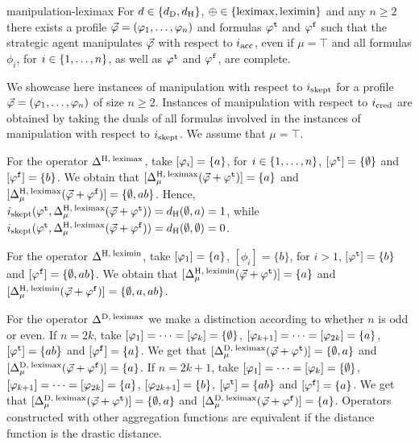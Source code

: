 \begin{thm}{}{manipulation-leximax}
	For $d\in\set{\dd_\drastic,\dd_\hamming}$, $\agg\in\set{\leximax,\leximin}$
	and any $n\geq 2$ there exists a profile $\P=(\phi_1,\dots,\phi_n)$ and formulas
	$\truth{\phi}$ and $\manip{\phi}$ such that the strategic agent 
	manipulates $\P$ with respect to $i_\acc$,
	even if $\mu=\top$ and all formulas $\phi_i$, 
	for $i\in\set{1,\dots,n}$, as well as $\truth{\phi}$ and $\manip{\phi}$, are complete.
\end{thm}
\begin{prf*}{}{}%
	We showcase here instances of manipulation with respect 
	to $i_\skept$ for a profile $\P=(\phi_1,\dots,\phi_n)$ 
	of size $n\geq 2$. Instances of manipulation with respect to 
	$i_\cred$ are obtained by taking the duals of 
	all formulas involved in the instances of manipulation with respect to $i_\skept$.
	We assume that $\mu=\top$.
	
	For the operator $\me^{\hamming,\:\leximax}$,
	take $\mods{\phi_i}=\set{a}$, 
	for $i\in\set{1,\dots,n}$, 
	$\mods{\truth{\phi}}=\set{\emptyset}$ 
	and $\mods{\manip{\phi}}=\set{b}$.
	We obtain that 
	$\mods{\me^{\hamming,\:\leximax}_{\mu}(\P+\truth{\phi})}=\set{a}$ and 
	$\mods{\me^{\hamming,\:\leximax}_{\mu}(\P+\manip{\phi})}=\set{\emptyset,ab}$.
	Hence, $\iskept(\truth{\phi}, \me^{\hamming,\:\leximax}_{\mu}(\P+\truth{\phi})) = \dd_{\hamming}(\emptyset,a)=1$,
	while $\iskept(\truth{\phi}, \me^{\hamming,\:\leximax}_{\mu}(\P+\manip{\phi})) = \dd_{\hamming}(\emptyset,\emptyset)=0$.
		
	For the operator $\me^{\hamming,\:\leximin}$,
	take $\mods{\phi_1}=\set{a}$, $[\phi_i]=\{b\}$,
	for $i>1$,
	$\mods{\truth{\phi}}=\{b\}$ 
	and $\mods{\manip{\phi}}=\{\emptyset,ab\}$.
	We obtain that 
	$\mods{\me^{\hamming,\:\leximin}_{\mu}(\P+\truth{\phi})}=\{a\}$ and 
	$\mods{\me^{\hamming,\:\leximin}_{\mu}(\P+\manip{\phi})}=\{\emptyset,a,ab\}$.

	For the operator $\me^{\drastic,\:\leximax}$
	we make a distinction according to whether $n$ is odd or even.
	If $n=2k$,
	take $\mods{\phi_1}=\dots=\mods{\phi_k}=\set{\emptyset}$, 
	$\mods{\phi_{k+1}}=\dots=\mods{\phi_{2k}}=\set{a}$,
	$\mods{\truth{\phi}}=\set{ab}$ and $\mods{\manip{\phi}}=\set{a}$.
	We get that $\mods{\me^{\drastic,\:\leximax}_{\mu}(\P+\truth{\phi})}=\set{\emptyset, a}$ 
	and $\mods{\me^{\drastic,\:\leximax}_{\mu}(\P+\manip{\phi})}=\set{a}$.
	If $n=2k+1$,
	take $\mods{\phi_1}=\dots=\mods{\phi_k}=\set{\emptyset}$, 
	$\mods{\phi_{k+1}}=\dots=\mods{\phi_{2k}}=\set{a}$,
	$\mods{\phi_{2k+1}}=\set{b}$,
	$\mods{\truth{\phi}}=\set{ab}$ and $\mods{\manip{\phi}}=\set{a}$.
	We get that $\mods{\me^{\drastic,\:\leximax}_{\mu}(\P+\truth{\phi})}=\set{\emptyset, a}$ 
	and $\mods{\me^{\drastic,\:\leximax}_{\mu}(\P+\manip{\phi})}=\set{a}$.
	Operators constructed with other aggregation functions are equivalent if 
	the distance function is the drastic distance.
\end{prf*}

